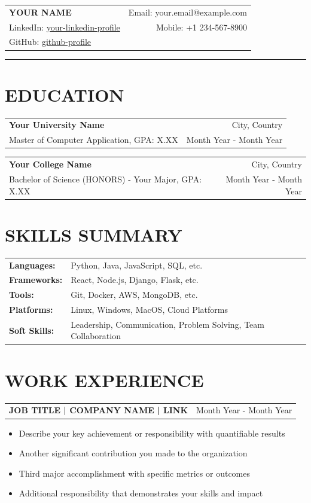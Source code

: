 \documentclass[11pt,a4paper]{article}
\newcommand{\resumeheader}[4]{
    \begin{tabularx}{\textwidth}{X r}
        \textbf{\Large #1} & Email: #3 \\
        LinkedIn: \href{#2}{#2} & Mobile: #4 \\
        GitHub: \href{#2}{github-profile} & \\
    \end{tabularx}
    \vspace{0.1in}
    \hrule
    \vspace{0.15in}
}
\newcommand{\education}[4]{
    \begin{tabularx}{\textwidth}{X r}
        \textbf{#1} & #3 \\
        #2 & #4 \\
    \end{tabularx}
    \vspace{0.1in}
}
\newcommand{\experience}[3]{
    \begin{tabularx}{\textwidth}{X r}
        \textbf{#1} & #3 \\
    \end{tabularx}
    \vspace{0.05in}
    #2
    \vspace{0.1in}
}
\begin{document}
\resumeheader{YOUR NAME}{your-linkedin-profile}{your.email@example.com}{+1 234-567-8900}

\section*{EDUCATION}

\education{Your University Name}{Master of Computer Application, GPA: X.XX}{City, Country}{Month Year - Month Year}

\education{Your College Name}{Bachelor of Science (HONORS) - Your Major, GPA: X.XX}{City, Country}{Month Year - Month Year}

\section*{SKILLS SUMMARY}

\begin{tabularx}{\textwidth}{l X}
\textbf{Languages:} & Python, Java, JavaScript, SQL, etc. \\
\textbf{Frameworks:} & React, Node.js, Django, Flask, etc. \\
\textbf{Tools:} & Git, Docker, AWS, MongoDB, etc. \\
\textbf{Platforms:} & Linux, Windows, MacOS, Cloud Platforms \\
\textbf{Soft Skills:} & Leadership, Communication, Problem Solving, Team Collaboration \\
\end{tabularx}

\section*{WORK EXPERIENCE}

\experience{JOB TITLE | COMPANY NAME | LINK}{
\begin{itemize}[leftmargin=*,noitemsep,topsep=0pt]
    \item Describe your key achievement or responsibility with quantifiable results
    \item Another significant contribution you made to the organization
    \item Third major accomplishment with specific metrics or outcomes
    \item Additional responsibility that demonstrates your skills and impact
\end{itemize}
}{Month Year - Month Year}
\end{document}
